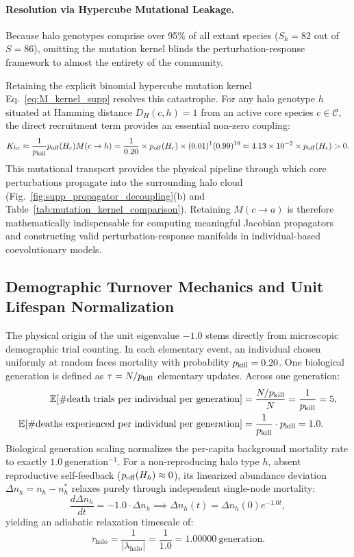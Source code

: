\documentclass[11pt,a4paper]{article}
\newcommand{\pk}{p_{\rm kill}}
\newcommand{\poff}{p_{\rm off}}
\begin{document}
\paragraph*{Resolution via Hypercube Mutational Leakage.}
Because halo genotypes comprise over 95\% of all extant species ($S_h = 82$ out of $S = 86$), omitting the mutation kernel blinds the perturbation-response framework to almost the entirety of the community. 

Retaining the explicit binomial hypercube mutation kernel Eq.~\eqref{eq:M_kernel_supp} resolves this catastrophe. For any halo genotype $h$ situated at Hamming distance $D_H(c,h) = 1$ from an active core species $c \in \mathcal{C}$, the direct recruitment term provides an essential non-zero coupling:
\begin{equation}
K_{hc} \approx \frac{1}{\pk} \poff(H_c) M(c \to h) = \frac{1}{0.20} \times \poff(H_c) \times (0.01)^1 (0.99)^{19} \approx 4.13 \times 10^{-2} \times \poff(H_c) > 0.
\end{equation}
This mutational transport provides the physical pipeline through which core perturbations propagate into the surrounding halo cloud (Fig.~\ref{fig:supp_propagator_decoupling}(b) and Table~\ref{tab:mutation_kernel_comparison}). Retaining $M(c \to a)$ is therefore mathematically indispensable for computing meaningful Jacobian propagators and constructing valid perturbation-response manifolds in individual-based coevolutionary models.

\subsection{Demographic Turnover Mechanics and Unit Lifespan Normalization}
\label{sec:demographic_turnover_mechanics}

The physical origin of the unit eigenvalue $-1.0$ stems directly from microscopic demographic trial counting. In each elementary event, an individual chosen uniformly at random faces mortality with probability $\pk = 0.20$. One biological generation is defined as $\tau = N / \pk$ elementary updates. Across one generation:
\begin{align}
\mathbb{E}[\#\text{death trials per individual per generation}] &= \frac{N/\pk}{N} = \frac{1}{\pk} = 5, \\
\mathbb{E}[\#\text{deaths experienced per individual per generation}] &= \frac{1}{\pk} \cdot \pk = 1.0.
\end{align}
Biological generation scaling normalizes the per-capita background mortality rate to exactly $1.0\ \text{generation}^{-1}$. For a non-reproducing halo type $h$, absent reproductive self-feedback ($\poff(H_h) \approx 0$), its linearized abundance deviation $\Delta n_h = n_h - n_h^*$ relaxes purely through independent single-node mortality:
\begin{equation}
\frac{d\Delta n_h}{dt} = -1.0 \cdot \Delta n_h \implies \Delta n_h(t) = \Delta n_h(0) e^{-1.0 t},
\end{equation}
yielding an adiabatic relaxation timescale of:
\begin{equation}
\tau_{\mathrm{halo}} = \frac{1}{|\lambda_{\mathrm{halo}}|} = \frac{1}{1.0} = 1.00000\ \text{generation}.
\end{equation}
\end{document}
